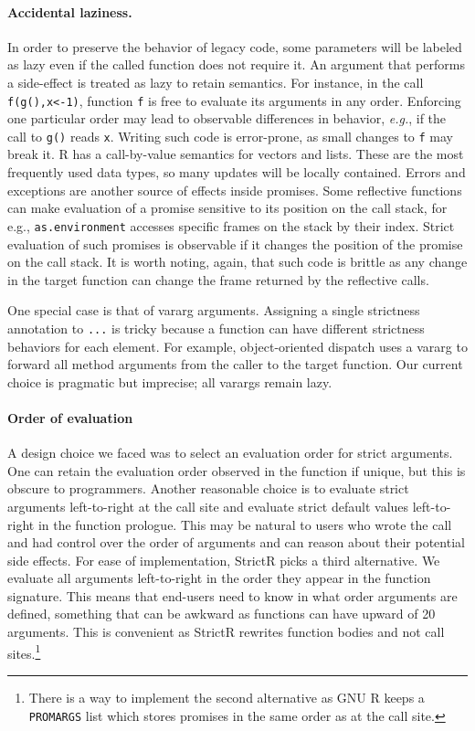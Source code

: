 \documentclass[review,screen,acmsmall]{acmart}
\renewcommand{\c}[1]{\lstinline |#1|\xspace}
\newcommand{\strictr}{{\sf StrictR}\xspace}
\newcommand{\eg}{\emph{e.g.},\xspace}
\begin{document}
\paragraph{Accidental laziness.} In order to preserve the behavior of legacy
code, some parameters will be labeled as lazy even if the called function does
not require it. An argument that performs a side-effect is treated as lazy to
retain semantics. For instance, in the call \c{f(g(),x<-1)}, function \c f is
free to evaluate its arguments in any order. Enforcing one particular order may
lead to observable differences in behavior, \eg if the call to \c{g()} reads
\c{x}. Writing such code is error-prone, as small changes to \c f may break it.
R has a call-by-value semantics for vectors and lists. These are the most
frequently used data types, so many updates will be locally contained. Errors
and exceptions are another source of effects inside promises. Some reflective
functions can make evaluation of a promise sensitive to its position on the call
stack, for e.g., \c{as.environment} accesses specific frames on the stack by
their index. Strict evaluation of such promises is observable if it changes the
position of the promise on the call stack. It is worth noting, again, that such
code is brittle as any change in the target function can change the frame
returned by the reflective calls.

One special case is that of vararg arguments. Assigning a single strictness
annotation to \c{...} is tricky because a function can have different strictness
behaviors for each element. For example, object-oriented dispatch uses a vararg
to forward all method arguments from the caller to the target function. Our
current choice is pragmatic but imprecise; all varargs remain lazy.

\paragraph{Order of evaluation} A design choice we faced was to select an
evaluation order for strict arguments. One can retain the evaluation order
observed in the function if unique, but this is obscure to programmers. Another
reasonable choice is to evaluate strict arguments left-to-right at the call site
and evaluate strict default values left-to-right in the function prologue. This
may be natural to users who wrote the call and had control over the order of
arguments and can reason about their potential side effects. For ease of
implementation, \strictr picks a third alternative. We evaluate all arguments
left-to-right in the order they appear in the function signature. This means
that end-users need to know in what order arguments are defined, something that
can be awkward as functions can have upward of 20 arguments. This is convenient
as \strictr rewrites function bodies and not call sites.\footnote{There is a way
  to implement the second alternative as GNU R keeps a \c{PROMARGS} list which
  stores promises in the same order as at the call site.}
\end{document}
